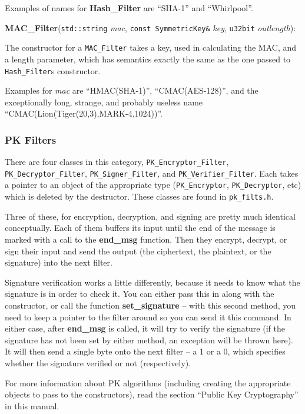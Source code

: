 \documentclass{article}
\newcommand{\filename}[1]{\texttt{#1}}
\newcommand{\function}[1]{\textbf{#1}}
\newcommand{\type}[1]{\texttt{#1}}
\renewcommand{\arg}[1]{\textsl{#1}}
\begin{document}
Examples of names for \function{Hash\_Filter} are ``SHA-1'' and ``Whirlpool''.

\noindent
\function{MAC\_Filter}(\type{std::string} \arg{mac},
                       \type{const SymmetricKey\&} \arg{key},
                       \type{u32bit} \arg{outlength}):

The constructor for a \type{MAC\_Filter} takes a key, used in calculating the
MAC, and a length parameter, which has semantics exactly the same as the one
passed to \type{Hash\_Filter}s constructor.

Examples for \arg{mac} are ``HMAC(SHA-1)'', ``CMAC(AES-128)'', and the
exceptionally long, strange, and probably useless name
``CMAC(Lion(Tiger(20,3),MARK-4,1024))''.

\subsubsection{PK Filters}

There are four classes in this category, \type{PK\_Encryptor\_Filter},
\type{PK\_Decryptor\_Filter}, \type{PK\_Signer\_Filter}, and
\type{PK\_Verifier\_Filter}. Each takes a pointer to an object of the
appropriate type (\type{PK\_Encryptor}, \type{PK\_Decryptor}, etc) which is
deleted by the destructor. These classes are found in \filename{pk\_filts.h}.

Three of these, for encryption, decryption, and signing are pretty much
identical conceptually. Each of them buffers its input until the end of the
message is marked with a call to the \function{end\_msg} function. Then they
encrypt, decrypt, or sign their input and send the output (the ciphertext, the
plaintext, or the signature) into the next filter.

Signature verification works a little differently, because it needs to know
what the signature is in order to check it. You can either pass this in along
with the constructor, or call the function \function{set\_signature} -- with
this second method, you need to keep a pointer to the filter around so you can
send it this command. In either case, after \function{end\_msg} is called, it
will try to verify the signature (if the signature has not been set by either
method, an exception will be thrown here). It will then send a single byte onto
the next filter -- a 1 or a 0, which specifies whether the signature verified
or not (respectively).

For more information about PK algorithms (including creating the appropriate
objects to pass to the constructors), read the section ``Public Key
Cryptography'' in this manual.
\end{document}
